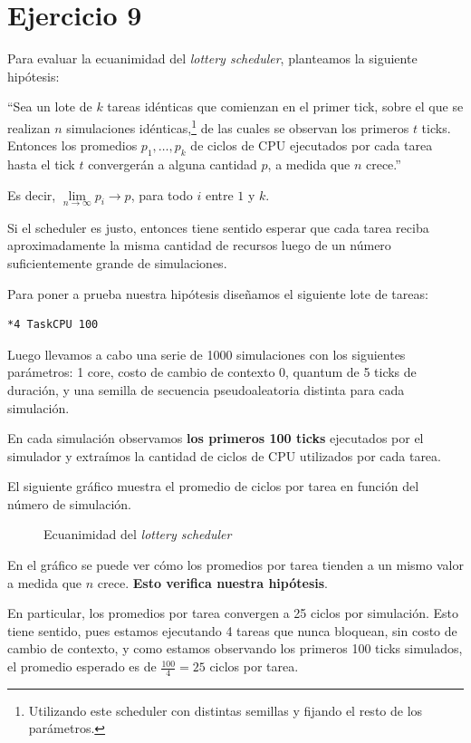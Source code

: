 \documentclass[a4paper,10pt,twoside]{article}
\begin{document}
\section{Ejercicio 9}

Para evaluar la ecuanimidad del \textit{lottery scheduler}, planteamos la siguiente hipótesis:

``Sea un lote de $k$ tareas idénticas que comienzan en el primer tick, sobre el que se realizan $n$ simulaciones idénticas,\footnote{Utilizando este scheduler con distintas semillas y fijando el resto de los parámetros.} de las cuales se observan los primeros $t$ ticks. Entonces los promedios $p_1, \ldots, p_k$ de ciclos de CPU ejecutados por cada tarea hasta el tick $t$ convergerán a alguna cantidad $p$, a medida que $n$ crece.''

Es decir, $\lim \limits_{n \to \infty} p_i \to p$, para todo $i$ entre $1$ y $k$.

Si el scheduler es justo, entonces tiene sentido esperar que cada tarea reciba aproximadamente la misma cantidad de recursos luego de un número suficientemente grande de simulaciones. 

Para poner a prueba nuestra hipótesis diseñamos el siguiente lote de tareas:

\begin{verbatim}
*4 TaskCPU 100
\end{verbatim}

Luego llevamos a cabo una serie de 1000 simulaciones con los siguientes parámetros: 1 core, costo de cambio de contexto 0, quantum de 5 ticks de duración, y una semilla de secuencia pseudoaleatoria distinta para cada simulación.

En cada simulación observamos \textbf{los primeros 100 ticks} ejecutados por el simulador y extraímos la cantidad de ciclos de CPU utilizados por cada tarea.

El siguiente gráfico muestra el promedio de ciclos por tarea en función del número de simulación.

\begin{figure}[H]
	\centering
	
	\caption{Ecuanimidad del \textit{lottery scheduler}}
\end{figure}

En el gráfico se puede ver cómo los promedios por tarea tienden a un mismo valor a medida que $n$ crece. \textbf{Esto verifica nuestra hipótesis}.

En particular, los promedios por tarea convergen a 25 ciclos por simulación. Esto tiene sentido, pues estamos ejecutando 4 tareas que nunca bloquean, sin costo de cambio de contexto, y como estamos observando los primeros 100 ticks simulados, el promedio esperado es de $\frac{100}{4} = 25$ ciclos por tarea.
\end{document}
